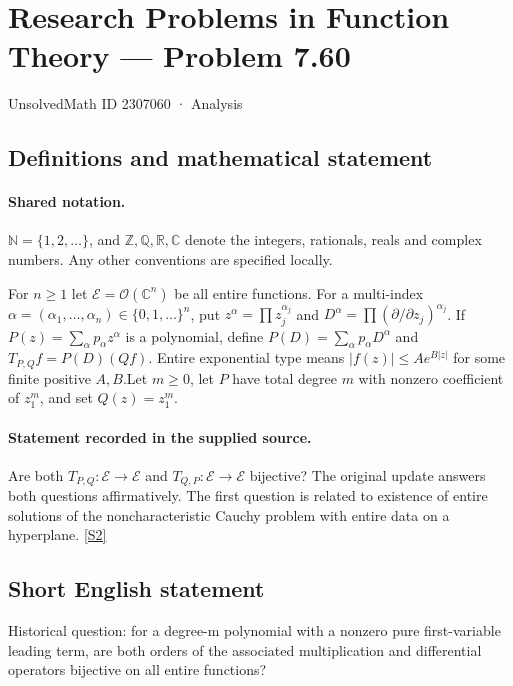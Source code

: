 \documentclass[11pt]{article}
\newcommand{\sref}[2]{\hyperlink{source:#1:#2}{[S#2]}}
\begin{document}
\setcounter{section}{2307059}
\section{Research Problems in Function Theory — Problem 7.60}\label{2307060}
{\small\sffamily UnsolvedMath ID 2307060 · Analysis}
\subsection{Definitions and mathematical statement}

\paragraph{Shared notation.}$\mathbb N=\{1,2,\ldots\}$, and $\mathbb Z,\mathbb Q,\mathbb R,\mathbb C$ denote the integers, rationals, reals and complex numbers. Any other conventions are specified locally.


For $n\ge1$ let $\mathcal E=\mathcal O(\mathbb C^n)$ be all entire functions. For a multi-index $\alpha=(\alpha_1,\ldots,\alpha_n)\in\{0,1,\ldots\}^n$, put $z^\alpha=\prod z_j^{\alpha_j}$ and $D^\alpha=\prod(\partial/\partial z_j)^{\alpha_j}$. If $P(z)=\sum_\alpha p_\alpha z^\alpha$ is a polynomial, define $P(D)=\sum_\alpha p_\alpha D^\alpha$ and $T_{P,Q}f=P(D)(Qf)$. Entire exponential type means $|f(z)|\le A e^{B|z|}$ for some finite positive $A,B$.Let $m\ge0$, let $P$ have total degree $m$ with nonzero coefficient of $z_1^m$, and set $Q(z)=z_1^m$.
\paragraph{Statement recorded in the supplied source.}
Are both $T_{P,Q}:\mathcal E\to\mathcal E$ and $T_{Q,P}:\mathcal E\to\mathcal E$ bijective? The original update answers both questions affirmatively. The first question is related to existence of entire solutions of the noncharacteristic Cauchy problem with entire data on a hyperplane. \sref{2307060}{2}
\subsection{Short English statement}
Historical question: for a degree-m polynomial with a nonzero pure first-variable leading term, are both orders of the associated multiplication and differential operators bijective on all entire functions?
\end{document}
